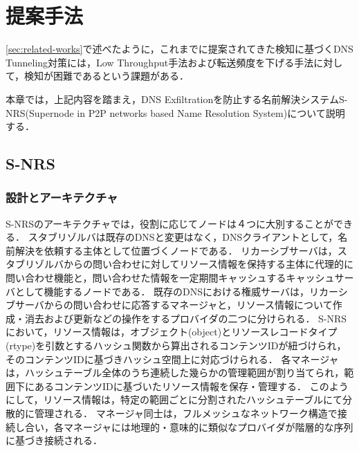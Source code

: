 \section{提案手法}
\ref{sec:related-works}で述べたように，これまでに提案されてきた検知に基づくDNS Tunneling対策には，Low Throughput手法および転送頻度を下げる手法に対して，検知が困難であるという課題がある．

本章では，上記内容を踏まえ，DNS Exfiltrationを防止する名前解決システムS-NRS(Supernode in P2P networks based Name Resolution System)について説明する．

\subsection{S-NRS}
\subsubsection{設計とアーキテクチャ}
S-NRSのアーキテクチャでは，役割に応じてノードは４つに大別することができる．
スタブリゾルバは既存のDNSと変更はなく，DNSクライアントとして，名前解決を依頼する主体として位置づくノードである．
リカーシブサーバは，スタブリゾルバからの問い合わせに対してリソース情報を保持する主体に代理的に問い合わせ機能と，問い合わせた情報を一定期間キャッシュするキャッシュサーバとして機能するノードである．
既存のDNSにおける権威サーバは，リカーシブサーバからの問い合わせに応答するマネージャと，リソース情報について作成・消去および更新などの操作をするプロバイダの二つに分けられる．
S-NRSにおいて，リソース情報は，オブジェクト(object)とリソースレコードタイプ(rtype)を引数とするハッシュ関数から算出されるコンテンツIDが紐づけられ，そのコンテンツIDに基づきハッシュ空間上に対応づけられる．
各マネージャは，ハッシュテーブル全体のうち連続した幾らかの管理範囲が割り当てられ，範囲下にあるコンテンツIDに基づいたリソース情報を保存・管理する．
このようにして，リソース情報は，特定の範囲ごとに分割されたハッシュテーブルにて分散的に管理される．
マネージャ同士は，フルメッシュなネットワーク構造で接続し合い，各マネージャには地理的・意味的に類似なプロバイダが階層的な序列に基づき接続される．

